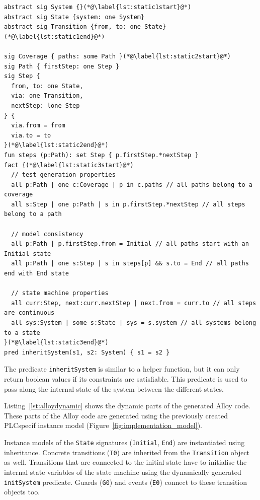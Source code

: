\begin{lstlisting}[label={lst:alloystatic}, caption=Static parts of the generated Alloy code,breaklines=true]
abstract sig System {}(*@\label{lst:static1start}@*)
abstract sig State {system: one System}
abstract sig Transition {from, to: one State}(*@\label{lst:static1end}@*)

sig Coverage { paths: some Path }(*@\label{lst:static2start}@*)
sig Path { firstStep: one Step }
sig Step {
  from, to: one State,
  via: one Transition,
  nextStep: lone Step
} {
  via.from = from
  via.to = to
}(*@\label{lst:static2end}@*)
fun steps (p:Path): set Step { p.firstStep.*nextStep }
fact {(*@\label{lst:static3start}@*)
  // test generation properties
  all p:Path | one c:Coverage | p in c.paths // all paths belong to a coverage
  all s:Step | one p:Path | s in p.firstStep.*nextStep // all steps belong to a path

  // model consistency
  all p:Path | p.firstStep.from = Initial // all paths start with an Initial state
  all p:Path | one s:Step | s in steps[p] && s.to = End // all paths end with End state
	
  // state machine properties
  all curr:Step, next:curr.nextStep | next.from = curr.to // all steps are continuous
  all sys:System | some s:State | sys = s.system // all systems belong to a state
}(*@\label{lst:static3end}@*)
pred inheritSystem(s1, s2: System) { s1 = s2 }
\end{lstlisting}

The predicate \texttt{inheritSystem} is similar to a helper function, but it can only return boolean values if its constraints are satisfiable. This predicate is used to pass along the internal state of the system between the different states.

Listing~\ref{lst:alloydynamic} shows the dynamic parts of the generated Alloy code. These parts of the Alloy code are generated using the previously created PLCspecif instance model (Figure~\ref{fig:implementation_model}).

Instance models of the \texttt{State} signatures (\texttt{Initial}, \texttt{End}) are instantiated using inheritance. Concrete transitions (\texttt{T0}) are inherited from the \texttt{Transition} object as well. Transitions that are connected to the initial state have to initialise the internal state variables of the state machine using the dynamically generated \texttt{initSystem} predicate. Guards (\texttt{G0}) and events (\texttt{E0}) connect to these transition objects too.

